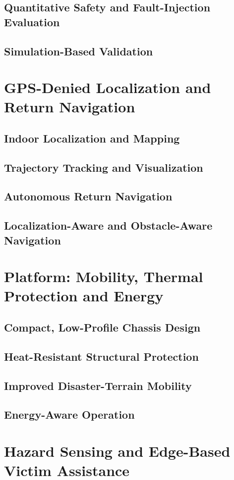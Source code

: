 \subsection{Quantitative Safety and Fault-Injection Evaluation}
\subsection{Simulation-Based Validation}
\section{GPS-Denied Localization and Return Navigation}
\subsection{Indoor Localization and Mapping}
\subsection{Trajectory Tracking and Visualization}
\subsection{Autonomous Return Navigation}
\subsection{Localization-Aware and Obstacle-Aware Navigation}
\section{Platform: Mobility, Thermal Protection and Energy}
\subsection{Compact, Low-Profile Chassis Design}
\subsection{Heat-Resistant Structural Protection}
\subsection{Improved Disaster-Terrain Mobility}
\subsection{Energy-Aware Operation}
\section{Hazard Sensing and Edge-Based Victim Assistance}
